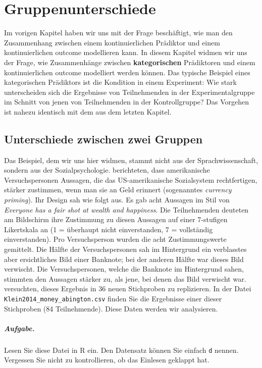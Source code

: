 \documentclass[oneside, 10pt]{book}\usepackage[]{graphicx}\usepackage[]{xcolor}
\begin{document}
\chapter{Gruppenunterschiede}\label{ch:gruppenunterschiede}

Im vorigen Kapitel haben wir uns mit der Frage
beschäftigt, wie man den Zusammenhang zwischen
einem kontinuierlichen Prädiktor und einem
kontinuierlichen outcome modellieren kann.
In diesem Kapitel widmen wir uns der Frage,
wie Zusammenhänge zwischen \textbf{kategorischen}
Prädiktoren und einem kontinuierlichen outcome
modelliert werden können. Das typische Beispiel
eines kategorischen Prädiktors ist die Kondition in einem Experiment:
Wie stark unterscheiden sich die Ergebnisse von Teilnehmenden
in der Experimentalgruppe im Schnitt von jenen von Teilnehmenden
in der Kontrollgruppe? Das Vorgehen ist nahezu identisch
mit dem aus dem letzten Kapitel.

\section{Unterschiede zwischen zwei Gruppen}
Das Beispiel, dem wir uns hier widmen, stammt nicht aus der
Sprachwissenschaft, sondern aus der Sozialpsychologie.
\citet[][Experiment 1]{Caruso2013} berichteten, dass
amerikanische Versuchspersonen Aussagen, die das US-amerikanische
Sozialsystem rechtfertigen, stärker zustimmen, wenn
man sie an Geld erinnert (sogenanntes \textit{currency priming}).
Ihr Design sah wie folgt aus. Es gab acht Aussagen im Stil von
\textit{Everyone has a fair shot at wealth and happiness}.
Die Teilnehmenden deuteten am Bildschirm
ihre Zustimmung zu diesen Aussagen
auf einer 7-stufigen Likertskala an (1 = überhaupt nicht einverstanden,
7 = vollständig einverstanden). Pro Versuchsperson wurden
die acht Zustimmungswerte gemittelt.
Die Hälfte der Versuchspersonen sah im Hintergrund ein verblasstes
aber ersichtliches Bild einer Banknote; bei der anderen Hälfte
war dieses Bild verwischt.
Die Versuchspersonen, welche die Banknote im Hintergrund sahen,
stimmten den Aussagen stärker zu, als jene, bei denen das Bild
verwischt war.
\citet{Klein2014} versuchten, dieses Ergebnis in 36 neuen
Stichproben zu replizieren.
In der Datei \texttt{Klein2014\_money\_abington.csv} finden Sie
die Ergebnisse einer dieser Stichproben (84 Teilnehmende).
Diese Daten werden wir analysieren.

\paragraph{Aufgabe.} Lesen Sie diese Datei in R ein.
Den Datensatz können Sie einfach \texttt{d} nennen.
Vergessen Sie nicht zu kontrollieren, ob das Einlesen
geklappt hat.
\end{document}
